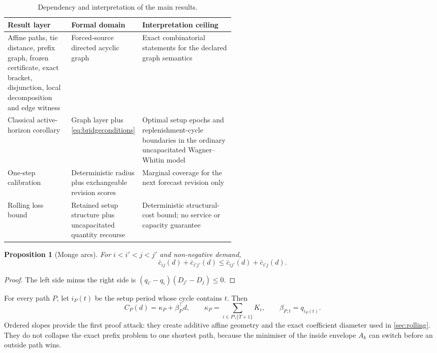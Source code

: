 \documentclass[11pt]{article}
\newtheorem{proposition}[theorem]{Proposition}
\theoremstyle{definition}
\begin{document}
\begin{table}[t]
\centering
\caption{Dependency and interpretation of the main results.}
\label{tab:dependencies}
\small
\begin{tabularx}{\linewidth}{@{}p{0.29\linewidth}p{0.23\linewidth}X@{}}
\toprule
Result layer & Formal domain & Interpretation ceiling \\
\midrule
Affine paths, tie distance, prefix graph, frozen certificate, exact bracket, disjunction, local decomposition and edge witness & Forced-source directed acyclic graph & Exact combinatorial statements for the declared graph semantics \\
Classical active-horizon corollary & Graph layer plus \eqref{eq:bridgeconditions} & Optimal setup epochs and replenishment-cycle boundaries in the ordinary uncapacitated Wagner--Whitin model \\
One-step calibration & Deterministic radius plus exchangeable revision scores & Marginal coverage for the next forecast revision only \\
Rolling loss bound & Retained setup structure plus uncapacitated quantity recourse & Deterministic structural-cost bound; no service or capacity guarantee \\
\bottomrule
\end{tabularx}
\end{table}

\begin{proposition}[Monge arcs]\label{prop:monge}
For $i<i'<j<j'$ and non-negative demand,
\[
\bar c_{ij}(d)+\bar c_{i'j'}(d)
\le
\bar c_{ij'}(d)+\bar c_{i'j}(d).
\]
\end{proposition}

\begin{proof}
The left side minus the right side is $(q_{i'}-q_i)(D_{j'}-D_j)\le0$.
\end{proof}

For every path $P$, let $i_P(t)$ be the setup period whose cycle contains $t$. Then
\begin{equation}\label{eq:affinepath}
C_P(d)=\kappa_P+\beta_P^\top d,
\qquad
\kappa_P=\sum_{i\in P\setminus\{T+1\}}K_i,
\qquad
\beta_{P,t}=q_{i_P(t)}.
\end{equation}
Ordered slopes provide the first proof attack: they create additive affine geometry and the exact coefficient diameter used in \cref{sec:rolling}. They do not collapse the exact prefix problem to one shortest path, because the minimiser of the inside envelope $A_k$ can switch before an outside path wins.
\end{document}
